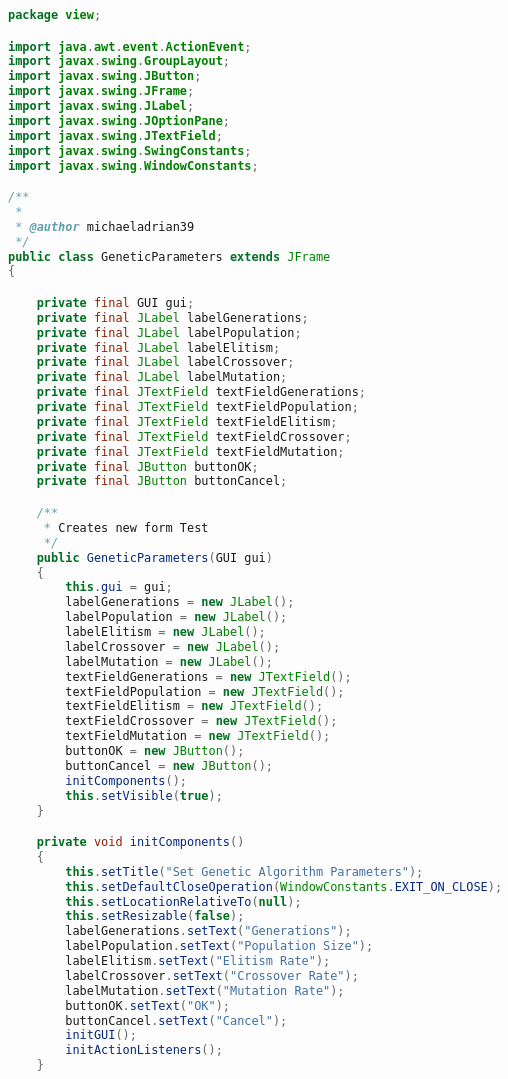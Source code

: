 \begin{lstlisting}[language=Java,basicstyle=\tiny,caption=GeneticParameters.java]
package view;

import java.awt.event.ActionEvent;
import javax.swing.GroupLayout;
import javax.swing.JButton;
import javax.swing.JFrame;
import javax.swing.JLabel;
import javax.swing.JOptionPane;
import javax.swing.JTextField;
import javax.swing.SwingConstants;
import javax.swing.WindowConstants;

/**
 *
 * @author michaeladrian39
 */
public class GeneticParameters extends JFrame
{

    private final GUI gui;
    private final JLabel labelGenerations;
    private final JLabel labelPopulation;
    private final JLabel labelElitism;
    private final JLabel labelCrossover;
    private final JLabel labelMutation;
    private final JTextField textFieldGenerations;
    private final JTextField textFieldPopulation;
    private final JTextField textFieldElitism;
    private final JTextField textFieldCrossover;
    private final JTextField textFieldMutation;
    private final JButton buttonOK;
    private final JButton buttonCancel;

    /**
     * Creates new form Test
     */
    public GeneticParameters(GUI gui)
    {
        this.gui = gui;
        labelGenerations = new JLabel();
        labelPopulation = new JLabel();
        labelElitism = new JLabel();
        labelCrossover = new JLabel();
        labelMutation = new JLabel();
        textFieldGenerations = new JTextField();
        textFieldPopulation = new JTextField();
        textFieldElitism = new JTextField();
        textFieldCrossover = new JTextField();
        textFieldMutation = new JTextField();
        buttonOK = new JButton();
        buttonCancel = new JButton();
        initComponents();
        this.setVisible(true);
    }

    private void initComponents()
    {
        this.setTitle("Set Genetic Algorithm Parameters");
        this.setDefaultCloseOperation(WindowConstants.EXIT_ON_CLOSE);
        this.setLocationRelativeTo(null);
        this.setResizable(false);
        labelGenerations.setText("Generations");
        labelPopulation.setText("Population Size");
        labelElitism.setText("Elitism Rate");
        labelCrossover.setText("Crossover Rate");
        labelMutation.setText("Mutation Rate");
        buttonOK.setText("OK");
        buttonCancel.setText("Cancel");
        initGUI();
        initActionListeners();
    }
    

\end{lstlisting}
